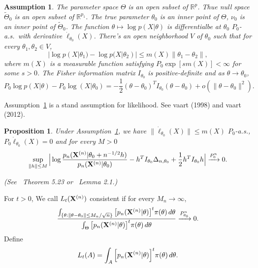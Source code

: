 \documentclass[3p]{elsarticle}
\theoremstyle{plain}
\newtheorem{proposition}{\quad\quad Proposition}
\newtheorem{assumption}{\quad\quad Assumption}
\theoremstyle{definition}
\theoremstyle{remark}
\begin{document}
\begin{assumption}\label{Assumption1}
The parameter space $\Theta$ is an open subset of $\mathbb{R}^p$. 
    Thue null space $\tilde{\Theta}_0$ is an open subset of $\mathbb{R}^{p_1}$.
    The true parameter $\theta_0$ is an inner point of $\Theta$, $\nu_0$ is an inner point of $\tilde{\Theta}_0$.
The function $\theta \mapsto \log p(X|\theta)$ is differentialbe at $\theta_0$  $P_0$-a.s.\ with derivative $\dot{\ell}_{\theta_0}(X)$.
There's an open neighborhood $V$ of $\theta_0$ such that for every $\theta_1,\theta_2\in V$,
        \begin{equation*}
            |\log p(X|\theta_1)-\log p(X|\theta_2)|\leq m(X)\|\theta_1-\theta_2\|,
        \end{equation*}
        where $m(X)$ is a measurable function satisfying $P_{0}\exp[s m(X)]<\infty$ for some $s>0$.
The Fisher information matrix $I_{\theta_0}$ is positive-definite and as $\theta\to \theta_0$,
    \begin{equation*}
        P_0 \log p(X|\theta)- P_0 \log (X|\theta_0)
        =-\frac{1}{2}(\theta-\theta_0)^T I_{\theta_0} (\theta-\theta_0)+o(\|\theta-\theta_0\|^2).
    \end{equation*}
\end{assumption}     
Assumption~\ref{Assumption1} is a stand assumption for likelihood. See vaart (1998) and vaart (2012).
\begin{proposition}\label{Thm:localExpansion}
    Under Assumption~\ref{Assumption1},
    we have $\|\dot{\ell}_{\theta_0}(X)\|\leq m(X)$ $P_0$-a.s., $P_0 \dot{\ell}_{\theta_0}(X)=0$ and for every $M>0$
    \begin{equation*}
        \sup_{\|h\|\leq M}\Big|
         \log \frac{p_n(\mathbf{X}^{(n)}|\theta_0+n^{-1/2}h)}{p_n(\mathbf{X}^{(n)}|\theta_0)}-h^T I_{\theta_0}\Delta_{n,\theta_0}+\frac{1}{2}h^T I_{\theta_0}h
        \Big|\xrightarrow{P^n_0}0.
    \end{equation*}

    (See~\cite{van2000asymptotic} Theorem 5.23 or~\cite{Kleijn2012The} Lemma 2.1.)
\end{proposition}
    For $t>0$, We call $L_t(\mathbf{X}^{(n)})$ consistent if for every $M_n\to \infty$,
    $$
    \frac{\int_{\{\theta:\|\theta-\theta_0\|\leq M_n/\sqrt{n}\}}\big[ p_n(\mathbf{X}^{(n)}|\theta)\big]^t \pi(\theta)\, d\theta}{\int_{\Theta}\big[p_n(\mathbf{X}^{(n)}|\theta)\big]^t \pi(\theta)\, d\theta}\xrightarrow{P_{\theta_0}^n} 0.
    $$
Define
$$
L_t (A)=\int_{A} \Big[ {p_n(\mathbf{X}^{(n)}|\theta)} \Big]^{t} \pi(\theta) \, d \theta.
$$
\end{document}
